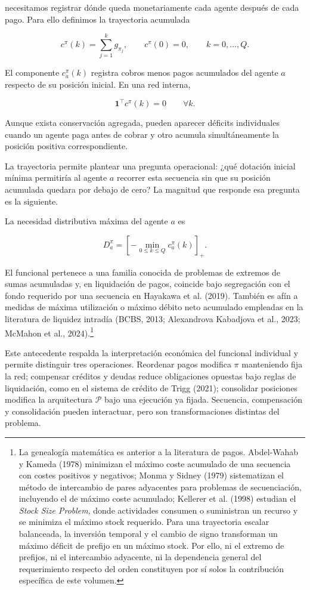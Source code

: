 \documentclass[10pt,a5paper,twoside]{article}
\begin{document}
necesitamos registrar dónde queda monetariamente cada agente después de cada pago.
Para ello definimos la trayectoria acumulada

\[
c^\pi(k)
=
\sum_{j=1}^k g_{\pi_j},
\qquad
c^\pi(0)=0,
\qquad
k=0,\ldots,Q.
\]

El componente \(c^\pi_a(k)\) registra cobros menos pagos acumulados del
agente \(a\) respecto de su posición inicial. En una red interna,

\[
\mathbf1^\top c^\pi(k)=0
\qquad
\forall k.
\]

Aunque exista conservación agregada, pueden aparecer déficits individuales
cuando un agente paga antes de cobrar y otro acumula simultáneamente la
posición positiva correspondiente.

La trayectoria permite plantear una pregunta operacional: ¿qué dotación inicial
mínima permitiría al agente \(a\) recorrer esta secuencia sin que su posición acumulada
quedara por debajo de cero? La magnitud que responde esa pregunta es la siguiente.

La necesidad distributiva máxima del agente \(a\) es

\[
D^\pi_a
=
\left[-\min_{0\le k\le Q}c^\pi_a(k)\right]_+.
\]

El funcional pertenece a una familia conocida de problemas de extremos de
sumas acumuladas y, en liquidación de pagos, coincide bajo segregación con el
fondo requerido por una secuencia en Hayakawa et al. (2019). También es afín a
medidas de máxima utilización o máximo débito neto acumulado empleadas en la
literatura de liquidez intradía (BCBS, 2013; Alexandrova Kabadjova et al.,
2023; McMahon et al., 2024).\footnote{La genealogía matemática es anterior a la literatura de pagos. Abdel-Wahab y
Kameda (1978) minimizan el máximo coste acumulado de una secuencia con costes
positivos y negativos; Monma y Sidney (1979) sistematizan el método de
intercambio de pares adyacentes para problemas de secuenciación, incluyendo el
de máximo coste acumulado; Kellerer et al. (1998) estudian el \emph{Stock Size
Problem}, donde actividades consumen o suministran un recurso y se minimiza el
máximo stock requerido. Para una trayectoria escalar balanceada, la inversión
temporal y el cambio de signo transforman un máximo déficit de prefijo en un
máximo stock. Por ello, ni el extremo de prefijos, ni el intercambio adyacente,
ni la dependencia general del requerimiento respecto del orden constituyen por
sí solos la contribución específica de este volumen.}

Este antecedente respalda la interpretación económica del funcional
individual y permite distinguir tres operaciones. Reordenar pagos modifica \(\pi\) manteniendo fija la
red; compensar créditos y deudas reduce obligaciones opuestas bajo reglas
de liquidación, como en el sistema de crédito de Trigg (2021); consolidar
posiciones modifica la arquitectura \(\mathcal P\) bajo una ejecución ya
fijada. Secuencia, compensación y consolidación pueden interactuar, pero son
transformaciones distintas del problema.
\end{document}
